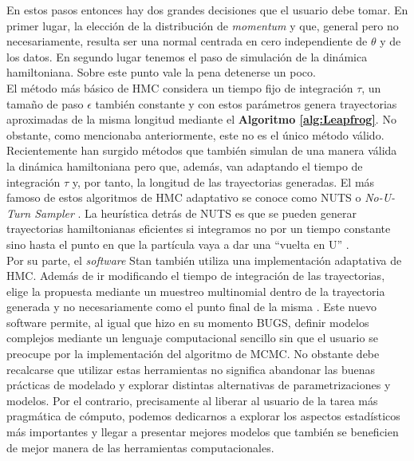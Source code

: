 En estos pasos entonces hay dos grandes decisiones que el usuario debe tomar. En primer lugar, la elección de la distribución de \textit{momentum} y que, general pero no necesariamente, resulta ser una normal centrada en cero independiente de $\theta$ y de los datos. En segundo lugar tenemos el paso de simulación de la dinámica hamiltoniana. Sobre este punto vale la pena detenerse un poco.\\ 

El método más básico de HMC considera un tiempo fijo de integración $\tau$, un tamaño de paso $\epsilon$ también constante y con estos parámetros genera  trayectorias aproximadas de la misma longitud mediante el \textbf{Algoritmo \ref{alg:Leapfrog}}. No obstante, como mencionaba anteriormente, este no es el único método válido. Recientemente han surgido métodos que también simulan de una manera válida la dinámica hamiltoniana pero que, además, van adaptando el tiempo de integración $\tau$ y, por tanto, la longitud de las trayectorias generadas. El más famoso de estos algoritmos de HMC adaptativo se conoce como NUTS o \textit{No-U-Turn Sampler} \parencite{NUTS11}. La heurística detrás de NUTS es que se pueden generar trayectorias hamiltonianas eficientes si integramos no por un tiempo constante sino hasta el punto en que la partícula vaya a dar una ``vuelta en U'' \parencite{Betancourt17,McElreath17}.\\

Por su parte, el \textit{software} Stan también utiliza una implementación adaptativa de HMC. Además de ir modificando el tiempo de integración de las trayectorias, elige la propuesta mediante un muestreo multinomial dentro de la trayectoria generada y no necesariamente como el punto final de la misma \parencite{Betancourt16,TuitSimpson18}. Este nuevo software permite, al igual que hizo en su momento BUGS, definir modelos complejos mediante un lenguaje computacional sencillo sin que el usuario se preocupe por la implementación del algoritmo de MCMC. No obstante debe recalcarse que utilizar estas herramientas no significa abandonar las buenas prácticas de modelado y explorar distintas alternativas de parametrizaciones y modelos. Por el contrario, precisamente al liberar al usuario de la tarea más pragmática de cómputo, podemos dedicarnos a explorar los aspectos estadísticos más importantes y llegar a presentar mejores modelos que también se beneficien de mejor manera de las herramientas computacionales.\\


